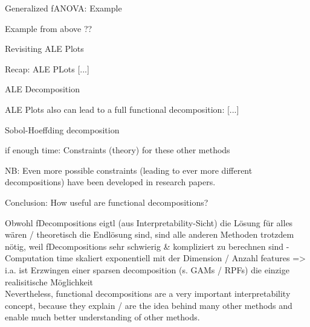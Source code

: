 \documentclass[11pt,compress,t,notes=noshow, aspectratio=169, xcolor=table]{beamer}
\begin{document}
\begin{frame}{Generalized fANOVA: Example}

    Example from above ??
    
\end{frame}

\begin{frame}{Revisiting ALE Plots}

    Recap: ALE PLots [...]
    
\end{frame}

\begin{frame}{ALE Decomposition}
    
    ALE Plots also can lead to a full functional decomposition: [...]
    
\end{frame}

\begin{frame}{Sobol-Hoeffding decomposition}
    
\end{frame}

\begin{frame}{if enough time: Constraints (theory) for these other methods}

    NB: Even more possible constraints (leading to ever more different decompositions) have been developed in research papers.
    
\end{frame}

\begin{frame}{Conclusion: How useful are functional decompositions?}

    Obwohl fDecompositions eigtl (aus Interpretability-Sicht) die Lösung für alles wären / theoretisch die Endlösung sind, sind alle anderen Methoden trotzdem nötig, weil fDecompositions sehr schwierig \& kompliziert zu berechnen sind
      - Computation time skaliert exponentiell mit der Dimension / Anzahl features  =>  i.a. ist Erzwingen einer sparsen decomposition (s. GAMs / RPFs) die einzige realisitische Möglichkeit \\

    Nevertheless, functional decompositions are a very important interpretability concept, because they explain / are the idea behind many other methods and enable much better understanding of other methods.
    
\end{frame}










\endlecture
\end{document}
